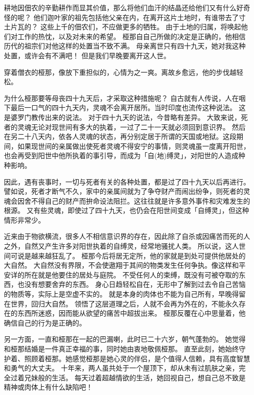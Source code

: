 \documentclass[twoside,openany]{book}
\begin{document}
耕地因佃农的辛勤耕作而显其价值，那么将他们血汗的结晶还给他们又有什么好奇怪的呢？
他们迦叶家的祖先包括他父亲在内，在离开这片土地时，有谁带去了寸土片瓦的？
这些上千的佃农们，不应做更多的牺牲。
由于土地的归属，将唤起他们对工作的热忱，以及对未来的希望。
桠那自自己所做的决定是正确的，他相信历代的祖宗们对他这样的处置当不致不满。
母亲离世只有四十九天，她对我这种处置，或许会有不满吧！
但是我们早晚要离开这人世。

穿着僧衣的桠那，像放下重担似的，心情为之一爽。离故乡愈远，他的步伐越轻松。

为什么桠那要等母丧四十九天后，才采取这种措施呢？
自古就有人传说，人在咽下最后一口气的四十九天内，灵魂不会离开居所。当时印度也流传这种说法。
这是婆罗门教传出来的说法。
对于四十九天的说法，今昔略有差异。
大致来说，死者的灵魂无论对现世间有多大的执着，一过了二十一天就必须回到意识界。
然后在另二十八天内，依各人灵魂的状态，再分别定居于所谓的天国或地狱。这段期间，如果现世间的亲属做出使死者灵魂不得安宁的事情，则灵魂虽一度离开阳世，也会再受到阳世中他所执着的事引导，而成为「自(地)缚灵」，对阳世的人造成种种影响。

因此，遇有丧事时，一切与死者有关的各种处置，都是过了四十九天以后再进行。
譬如说，死者才断气不久，家中的亲属间就为了争夺财产而闹出纷争，则死者的灵魂会因舍不得自己的财产而拚命设法阻拦。这往往就是许多意外事件和灾难发生的根源。
又有些灵魂，即使过了四十九天，也仍会在阳世间变成「自缚灵」，但这种情形非常少。

近来由于物欲横流，很多人不相信意识界的存在，因此除了自杀或因痛苦而死的人之外，自然又产生许多对阳世执着的自缚灵，经常地骚扰人类。
所以说，这人世间可说是越来越狂乱了。
桠那今后将居无定所，他的家就是到处可提供他居处的大自然。
大自然没有界限，不会使遨翔于其间的物类发生任何争执。像这样和平安详的所在就是他要住的居处与庭院。
不受任何人的束缚，既没有可被夺取的东西，也没有想要舍弃的东西。
身心日趋轻松自在，无形中了解到过去令自己苦恼的物质等，实际上是空虚不实的。
就是本身的肉体也不能为自己所有，早晚得留在世界，回归大自然。
领悟了这层道理之后，人就不会再为外在的，不能永久存在的东西所迷惑，因而能从欲望的痛苦中超拔出来。
桠那反覆在心中思量着，他确信自己的行为是正确的。

另一方面，一直和桠那在一起的巴漏喇，此时已二十六岁，朝气蓬勃的。
她觉得和桠那结婚是一件真正幸福的事，同时她由衷地敬佩桠那。
直至此刻，她始终守护着、照顾着桠那。她感觉桠那是她心灵的伴侣，是个值得人信赖，具有高度智慧和勇气的大丈夫。
十年来，两人虽共处于一个屋顶下，却从未有过肌肤之亲，完全过着兄妹般的生活。
每天过着超越情欲的生活，她回视自己，想自己总不致是精神或肉体上有什么缺陷吧！
\end{document}
